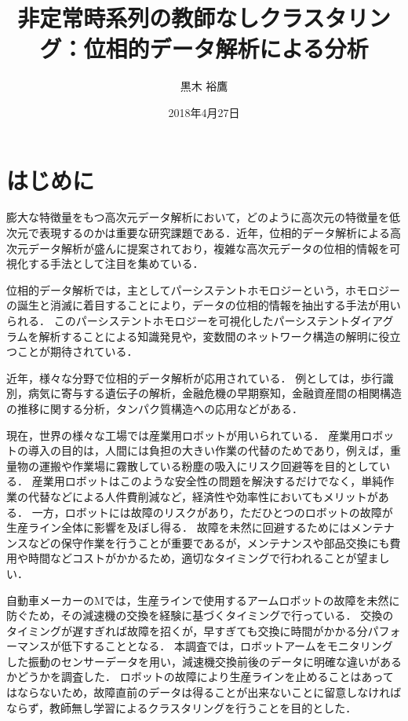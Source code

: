 \documentclass{jarticle}
\title{非定常時系列の教師なしクラスタリング：位相的データ解析による分析}
\author{黒木 裕鷹}
\date{2018年4月27日}
\begin{document}
\maketitle
\section{はじめに}
膨大な特徴量をもつ高次元データ解析において，どのように高次元の特徴量を低次元で表現するのかは重要な研究課題である．近年，位相的データ解析による高次元データ解析が盛んに提案されており，複雑な高次元データの位相的情報を可視化する手法として注目を集めている．

位相的データ解析では，主としてパーシステントホモロジー\cite{Edelsbrunner2002}という，ホモロジーの誕生と消滅に着目することにより，データの位相的情報を抽出する手法が用いられる．
このパーシステントホモロジーを可視化したパーシステントダイアグラム\cite{Otter2017}を解析することによる知識発見や，変数間のネットワーク構造の解明に役立つことが期待されている．

近年，様々な分野で位相的データ解析が応用されている．
例としては，歩行識別\cite{Lamar2012}，病気に寄与する遺伝子の解析\cite{Platt2016}，金融危機の早期察知\cite{Gidea2017}，金融資産間の相関構造の推移に関する分析\cite{Gidea2018}，タンパク質構造への応用\cite{Hiraoka2012}などがある．

現在，世界の様々な工場では産業用ロボットが用いられている．
産業用ロボットの導入の目的は，人間には負担の大きい作業の代替のためであり，例えば，重量物の運搬や作業場に霧散している粉塵の吸入にリスク回避等を目的としている．
産業用ロボットはこのような安全性の問題を解決するだけでなく，単純作業の代替などによる人件費削減など，経済性や効率性においてもメリットがある．
一方，ロボットには故障のリスクがあり，ただひとつのロボットの故障が生産ライン全体に影響を及ぼし得る．
故障を未然に回避するためにはメンテナンスなどの保守作業を行うことが重要であるが，メンテナンスや部品交換にも費用や時間などコストがかかるため，適切なタイミングで行われることが望ましい．


自動車メーカーのMでは，生産ラインで使用するアームロボットの故障を未然に防ぐため，その減速機の交換を経験に基づくタイミングで行っている．
交換のタイミングが遅すぎれば故障を招くが，早すぎても交換に時間がかかる分パフォーマンスが低下することとなる．
本調査では，ロボットアームをモニタリングした振動のセンサーデータを用い，減速機交換前後のデータに明確な違いがあるかどうかを調査した．
ロボットの故障により生産ラインを止めることはあってはならないため，故障直前のデータは得ることが出来ないことに留意しなければならず，教師無し学習によるクラスタリングを行うことを目的とした．
\end{document}

